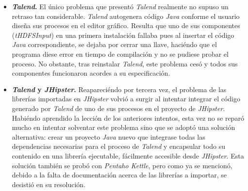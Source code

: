 \begin{itemize}
\item \textbf{\textit{Talend}.} El único problema que presentó \textit{Talend} realmente no supuso un retraso tan considerable. \textit{Talend} autogenera código \textit{Java} conforme el usuario diseña sus procesos en el editor gráfico. Resulta que uno de sus componentes (\textit{tHDFSInput}) en una primera instalación fallaba pues al insertar el código \textit{Java} correspondiente, se dejaba por cerrar una llave, haciéndo que el programa diese error en tiempo de compilación y no se pudiese probar el proceso. No obstante, tras reinstalar \textit{Talend}, este problema cesó y todos sus componentes funcionaron acordes a su especificación. 

\item \textbf{\textit{Talend} y \textit{JHipster}.} Reapareciéndo por tercera vez, el problema de las librerías importadas en \textit{JHipster} volvió a surgir al intentar integrar el código generado por \textit{Talend} de uno de sus procesos en el proyecto de \textit{JHipster}. Habiéndo aprendido la lección de los anteriores intentos, esta vez no se reparó mucho en intentar solventar este problema sino que se adoptó una solución alternativa: crear un proyecto \textit{Java} nuevo que integrase todas las dependencias necesarias para el proceso de \textit{Talend} y encapsular todo su contenido en una librería ejecutable, fácilmente accesible desde \textit{JHipster}. Esta solución también se probó con \textit{Pentaho Kettle}, pero como ya se mencionó, debido a la falta de documentación acerca de las librerías a importar, se desistió en su resolución.
\end{itemize}




























